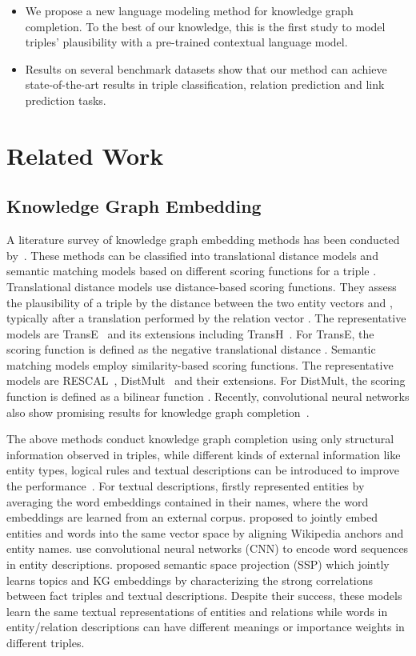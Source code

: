 \documentclass[letterpaper]{article} \usepackage{aaai20}  \usepackage{times}  \usepackage{helvet} \usepackage{courier}  \usepackage[hyphens]{url}  \usepackage{graphicx} \urlstyle{rm} \def\UrlFont{\rm}  \usepackage{graphicx}  \usepackage{amsmath}
\begin{document}
\begin{itemize}
    \item We propose a new language modeling method for knowledge graph completion. To the best of our knowledge, this is the first study to model triples' plausibility with a pre-trained contextual language model.
    \item Results on several benchmark datasets show that our method can achieve state-of-the-art results in triple classification, relation prediction and link prediction tasks. 
\end{itemize}

\section{Related Work}
\subsection{Knowledge Graph Embedding}
A literature survey of knowledge graph embedding methods has been conducted by~\cite{wang2017knowledge}. These methods can be classified into translational distance models and semantic matching models based on different scoring functions for a triple . Translational distance models use distance-based scoring functions. They assess the plausibility of a triple  by the distance between the two entity vectors  and , typically after a translation performed by the relation vector . The representative models are TransE~\cite{bordes2013translating} and its extensions including TransH~\cite{wang2014knowledge}. For TransE, the scoring function is defined as the negative translational distance . Semantic matching models employ similarity-based scoring functions. The representative models are RESCAL~\cite{nickel2011three}, DistMult~\cite{yang2015embedding} and their extensions. For DistMult, the scoring function is defined as a bilinear function . Recently, convolutional neural networks also show promising results for knowledge graph completion~\cite{dettmers2018convolutional,SWJ318,schlichtkrull2018modeling}.

The above methods conduct knowledge graph completion using only structural information observed in triples, while different kinds of external information like entity types, logical rules and textual descriptions can be introduced to improve the performance~\cite{wang2017knowledge}. For textual descriptions, \cite{socher2013reasoning} firstly represented entities by averaging the word embeddings contained in their names, where the word embeddings are learned from an external corpus. \cite{wang2014knowledgeb} proposed to jointly embed entities and words into the same vector space by aligning Wikipedia anchors and entity names. \cite{xie2016representation} use convolutional neural networks (CNN) to encode word sequences in entity descriptions. \cite{xiao2017ssp} proposed semantic space projection (SSP) which jointly learns topics and KG embeddings by characterizing the strong correlations between fact triples and textual descriptions. Despite their success, these models learn the same textual representations of entities and relations while words in entity/relation descriptions can have different meanings or importance weights in different triples. 
\end{document}
